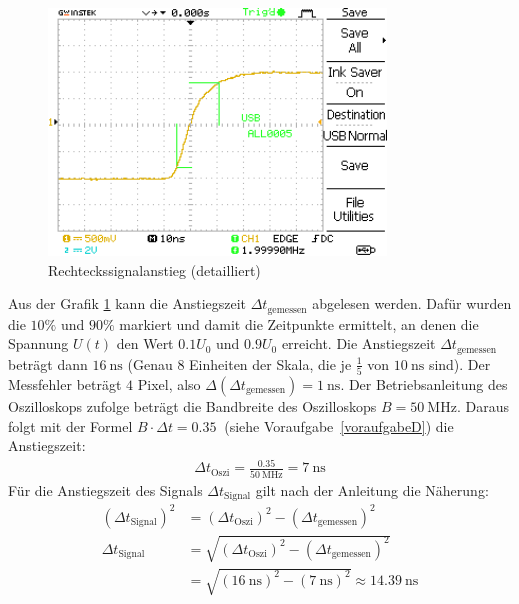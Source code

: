 \documentclass{article}
\begin{document}
				\begin{figure}[H]
					\centering
					\includegraphics[width=0.8\textwidth]{MesswerteVersuch0/A0005DS.png}
					\caption{Rechteckssignalanstieg (detailliert)}
					\label{fig:A0005DS}
				\end{figure}
				Aus der Grafik \ref{fig:A0005DS} kann die Anstiegszeit $\Delta t_\mathrm{gemessen}$ abgelesen werden. Dafür wurden die $10\%$ und $90\%$ markiert und damit die Zeitpunkte ermittelt, an denen die Spannung $U(t)$ den Wert $0.1 U_0$ und $0.9 U_0$ erreicht. Die Anstiegszeit $\Delta t_\mathrm{gemessen}$ beträgt dann $\SI{16}{\nano\second}$ (Genau $8$ Einheiten der Skala, die je $\frac{1}{5}$ von $\SI{10}{\nano\second}$ sind). Der Messfehler beträgt $4$ Pixel, also $\Delta(\Delta t_\mathrm{gemessen}) =  \SI{1}{\nano\second}$. Der Betriebsanleitung des Oszilloskops \cite{oszibedienungsanleitung} zufolge beträgt die Bandbreite des Oszilloskops $B = \SI{50}{\mega\hertz}$. Daraus folgt mit der Formel $B \cdot \Delta t = \SI{0.35}{}$ (siehe Voraufgabe~\ref{voraufgabeD}) die Anstiegszeit:
				\begin{align*}
					\Delta t_\mathrm{Oszi} = \frac{0.35}{\SI{50}{\mega\hertz}} = \SI{7}{\nano\second}
				\end{align*}
				Für die Anstiegszeit des Signals $\Delta t_\mathrm{Signal}$ gilt nach der Anleitung\cite{anleitung} die Näherung:
				\begin{align*}
					(\Delta t_\mathrm{Signal})^2 &= (\Delta t_\mathrm{Oszi})^2 - (\Delta t_\mathrm{gemessen})^2 \\
					\Delta t_\mathrm{Signal} &= \sqrt{(\Delta t_\mathrm{Oszi})^2 - (\Delta t_\mathrm{gemessen})^2} \\
					&= \sqrt{(\SI{16}{\nano\second})^2 - (\SI{7}{\nano\second})^2} \approx \SI{14.39}{\nano\second}
				\end{align*}
\end{document}
